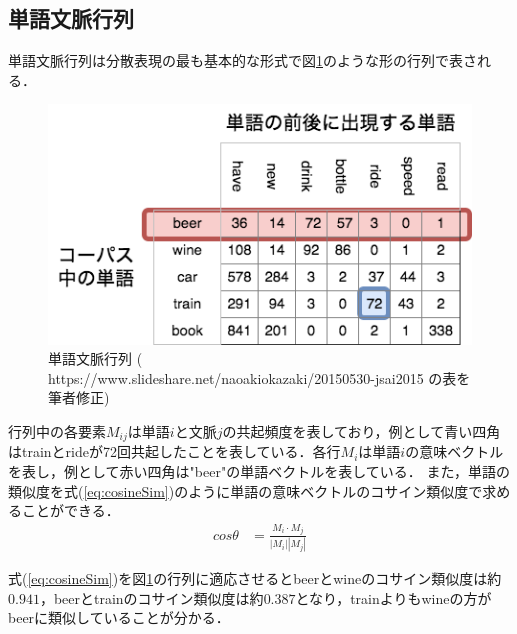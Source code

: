 \subsection{単語文脈行列}
\label{rel:wordEmbed:WordParagraphMat}
単語文脈行列は分散表現の最も基本的な形式で図\ref{Fig:WordParagraphMat}のような形の行列で表される．
\begin{figure}[htbp]
 \begin{center}
  \includegraphics[width=\textwidth]{../images/2.Related_Work/WordParagraphMatrix2.png}
  \caption{単語文脈行列\newline
  ( https://www.slideshare.net/naoakiokazaki/20150530-jsai2015 の表を筆者修正)}
  \label{Fig:WordParagraphMat}
  \vspace{-10pt}
 \end{center}
\end{figure}

行列中の各要素$M_{ij}$は単語$i$と文脈$j$の共起頻度を表しており，例として青い四角はtrainとrideが72回共起したことを表している．各行$M_i$は単語$i$の意味ベクトルを表し，例として赤い四角は"beer"の単語ベクトルを表している．
また，単語の類似度を式(\ref{eq:cosineSim})のように単語の意味ベクトルのコサイン類似度で求めることができる．
\begin{equation}
\begin{aligned}
\label{eq:cosineSim}
cos \theta & = \frac{M_i \cdot M_j}{ | M_i | | M_j |}
\end{aligned}
\end{equation}

式(\ref{eq:cosineSim})を図\ref{Fig:WordParagraphMat}の行列に適応させるとbeerとwineのコサイン類似度は約$0.941$，beerとtrainのコサイン類似度は約$0.387$となり，trainよりもwineの方がbeerに類似していることが分かる．
